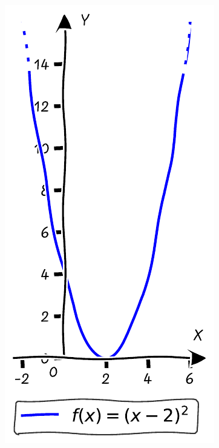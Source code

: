 \documentclass{tufte-handout}
\begin{document}
\begin{figure}[h]
  \begin{minipage}{0.18\textwidth}
    \includegraphics[width=\linewidth]{./graphs/quadratic_func_lsh_2.pdf}

\end{minipage}
\end{figure}
\end{document}
